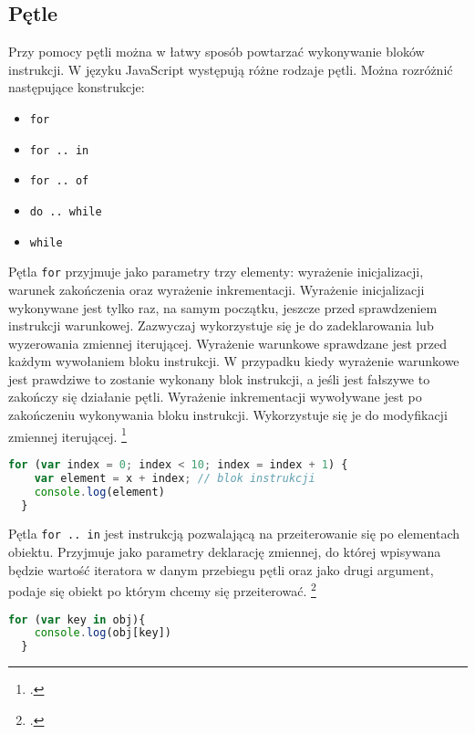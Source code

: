 \subsection{Pętle}
Przy pomocy pętli można w łatwy sposób powtarzać wykonywanie bloków instrukcji. W języku JavaScript występują różne rodzaje pętli. Można rozróżnić następujące konstrukcje:
\begin{itemize}
  \item \texttt{for}
  \item \texttt{for .. in}
  \item \texttt{for .. of}
  \item \texttt{do .. while}
  \item \texttt{while}
\end{itemize}

\par Pętla \texttt{for} przyjmuje jako parametry trzy elementy: wyrażenie inicjalizacji, warunek zakończenia oraz wyrażenie inkrementacji. Wyrażenie inicjalizacji wykonywane jest tylko raz, na samym początku, jeszcze przed sprawdzeniem instrukcji warunkowej. Zazwyczaj wykorzystuje się je do zadeklarowania lub wyzerowania zmiennej iterującej. Wyrażenie warunkowe sprawdzane jest przed każdym wywołaniem bloku instrukcji. W przypadku kiedy wyrażenie warunkowe jest prawdziwe to zostanie wykonany blok instrukcji, a jeśli jest fałszywe to zakończy się działanie pętli. Wyrażenie inkrementacji wywoływane jest po zakończeniu wykonywania bloku instrukcji. Wykorzystuje się je do modyfikacji zmiennej iterującej. \footcite{jsLoops_and_iteration}

\begin{lstlisting}[language=JavaScript, caption=Przykład użycia instrukcji \texttt{for}, label=alg:instrukcjaFor1]
  for (var index = 0; index < 10; index = index + 1) {
    var element = x + index; // blok instrukcji
    console.log(element)
  }
\end{lstlisting}

\par Pętla \texttt{for .. in} jest instrukcją pozwalającą na przeiterowanie się po elementach obiektu. Przyjmuje jako parametry deklarację zmiennej, do której wpisywana będzie wartość iteratora w danym przebiegu pętli oraz jako drugi argument, podaje się obiekt po którym chcemy się przeiterować. \footcite{jsLoops_and_iteration}

\begin{lstlisting}[language=JavaScript, caption=Przykład użycia instrukcji \texttt{for .. in}, label=alg:instrukcjaFor2]
  for (var key in obj){
    console.log(obj[key])
  }
\end{lstlisting}

